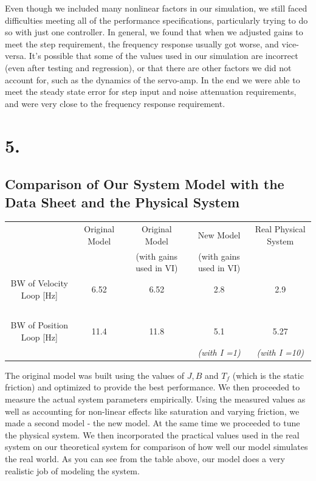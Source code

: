 \documentclass{article}
\theoremstyle{plain}
\theoremstyle{definition}
\theoremstyle{remark}
\begin{document}
Even though we included many nonlinear factors in our simulation, we still faced difficulties meeting all of the performance specifications, particularly trying to do so with just one controller. In general, we found that when we adjusted gains to meet the step requirement, the frequency response usually got worse, and vice-versa. It's possible that some of the values used in our simulation are incorrect (even after testing and regression), or that there are other factors we did not account for, such as the dynamics of the servo-amp. In the end we were able to meet the steady state error for step input and noise attenuation requirements, and were very close to the frequency response requirement.\\


\clearpage 

\section*{5.}
\subsection*{ Comparison of Our System Model with the Data Sheet and the Physical System}
\begin{table}[htb]
    \begin{tabular}{|c|c|c|c|c|}
        \hline
        ~                        & Original Model & Original Model   & New Model & Real Physical System \\ 
	~	& ~	& (with gains used in VI)& (with gains used in VI)& ~\\ \hline
        BW of Velocity Loop [Hz] & 6.52           & 6.52                                    & 2.8                               & 2.9                  \\ 
	~&	~&	~&	~&	~\\
        BW of Position Loop [Hz] & 11.4           & 11.8                                    & 5.1                    & 5.27     \\
	~ &~	&~	&\emph{(with I =1)} & \emph{(with I =10)}\\
        \hline
    \end{tabular}
\end{table}

The original model was built using the values of $J, B$ and $T_f$ (which is the static friction) and optimized to provide the best performance. We then proceeded to measure the actual system parameters empirically. Using the measured values as well as accounting for non-linear effects like saturation and varying friction, we made a second model - the new model. At the same time we proceeded to tune the physical system. We then incorporated the practical values used in the real system on our theoretical system for comparison of how well our model simulates the real world. As you can see from the table above, our model does a very realistic job of modeling the system.
\end{document}
